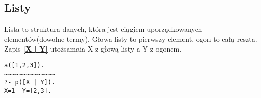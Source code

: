 \documentclass{article}
\begin{document}
\subsection{Listy}
Lista to struktura danych, która jest ciągiem uporządkowanych elementów(dowolne termy). Głowa listy to pierwszy element, ogon to całą reszta. Zapis  \textbf{\url{[X | Y]}} utożsamaia X z głową listy a Y z ogonem.
\begin{lstlisting}[caption=Utożsamianie głowy i ogona]
a([1,2,3]).
~~~~~~~~~~~~~~
?- p([X | Y]).
X=1  Y=[2,3].
\end{lstlisting}
\end{document}
